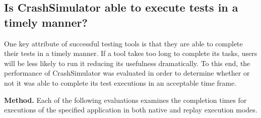 
\subsection{Is CrashSimulator able to execute tests in a timely  manner?}
\label{sec-perf}


One key attribute of successful testing tools is that they are able to
complete their tests in a timely manner.  If a tool takes too long to
complete its tasks, users will be less likely to run it
reducing its usefulness dramatically. To this end, the
performance of CrashSimulator was evaluated in order to determine whether
or not it was able to complete its test executions in an acceptable time
frame.  

{\bf Method.} Each of the following evaluations examines the completion
times for executions of the specified application in both
native and replay execution modes.


